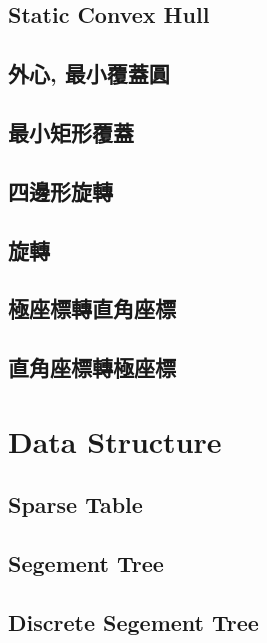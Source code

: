 \subsection{Static Convex Hull} 

\subsection{外心, 最小覆蓋圓} 

\subsection{最小矩形覆蓋}

\subsection{四邊形旋轉} 

\subsection{旋轉} 

\subsection{極座標轉直角座標}

\subsection{直角座標轉極座標}


\section{Data Structure}
\subsection{Sparse Table}

\subsection{Segement Tree}

\subsection{Discrete Segement Tree}

